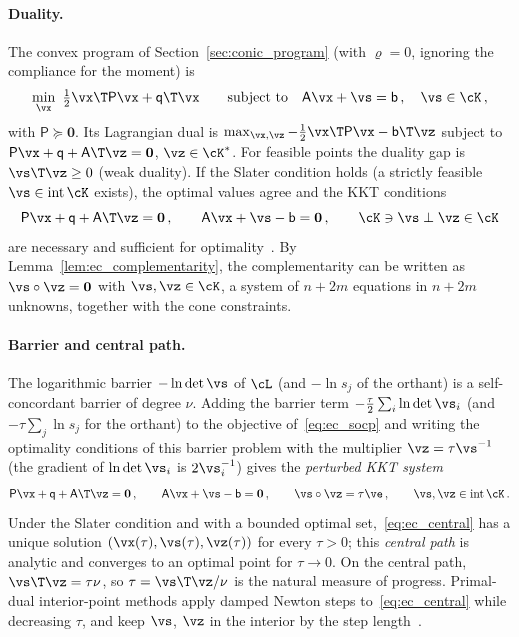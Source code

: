 \paragraph{Duality.} The convex program of Section~\ref{sec:conic_program} (with $\varrho = 0$, ignoring the compliance for the moment) is
%
\begin{equation}\label{eq:ec_socp}
	\min_{\vx} \ \tfrac{1}{2}\vx\T\mathsf{P}\vx + \mathsf{q}\T\vx \qquad \text{subject to} \quad \mathsf{A}\vx + \vs = \mathsf{b} \, , \quad \vs \in \cK \, ,
\end{equation}
%
with $\mathsf{P} \succeq \mathbf{0}$. Its Lagrangian dual is $\max_{\vx, \vz} -\tfrac{1}{2}\vx\T\mathsf{P}\vx - \mathsf{b}\T\vz$ subject to $\mathsf{P}\vx + \mathsf{q} + \mathsf{A}\T\vz = \mathbf{0}$, $\vz \in \cK^*$. For feasible points the duality gap is $\vs\T\vz \geq 0$ (weak duality). If the Slater condition holds (a strictly feasible $\vs \in \operatorname{int}\cK$ exists), the optimal values agree and the KKT conditions
%
\begin{equation}\label{eq:ec_kkt}
	\mathsf{P}\vx + \mathsf{q} + \mathsf{A}\T\vz = \mathbf{0} \, , \qquad
	\mathsf{A}\vx + \vs - \mathsf{b} = \mathbf{0} \, , \qquad
	\cK \ni \vs \perp \vz \in \cK
\end{equation}
%
are necessary and sufficient for optimality~\cite{AlizadehGoldfarb2003}. By Lemma~\ref{lem:ec_complementarity}, the complementarity can be written as $\vs\circ\vz = \mathbf{0}$ with $\vs, \vz \in \cK$, a system of $n + 2m$ equations in $n + 2m$ unknowns, together with the cone constraints.
%
\paragraph{Barrier and central path.} The logarithmic barrier $-\ln\det\vs$ of $\cL$ (and $-\ln s_j$ of the orthant) is a self-concordant barrier of degree $\nu$. Adding the barrier term $-\frac{\tau}{2}\sum_i \ln\det\vs_i$ (and $-\tau\sum_j\ln s_j$ for the orthant) to the objective of~\eqref{eq:ec_socp} and writing the optimality conditions of this barrier problem with the multiplier $\vz = \tau\vs^{-1}$ (the gradient of $\ln\det\vs_i$ is $2\vs_i^{-1}$) gives the \emph{perturbed KKT system}
%
\begin{equation}\label{eq:ec_central}
	\mathsf{P}\vx + \mathsf{q} + \mathsf{A}\T\vz = \mathbf{0} \, , \qquad
	\mathsf{A}\vx + \vs - \mathsf{b} = \mathbf{0} \, , \qquad
	\vs\circ\vz = \tau\ve \, , \qquad \vs, \vz \in \operatorname{int}\cK \, .
\end{equation}
%
Under the Slater condition and with a bounded optimal set,~\eqref{eq:ec_central} has a unique solution $(\vx(\tau), \vs(\tau), \vz(\tau))$ for every $\tau > 0$; this \emph{central path} is analytic and converges to an optimal point for $\tau \to 0$. On the central path, $\vs\T\vz = \tau\nu$, so $\tau = \vs\T\vz/\nu$ is the natural measure of progress. Primal-dual interior-point methods apply damped Newton steps to~\eqref{eq:ec_central} while decreasing $\tau$, and keep $\vs$, $\vz$ in the interior by the step length~\cite{Wright1997, NocedalWright2006}.
%
